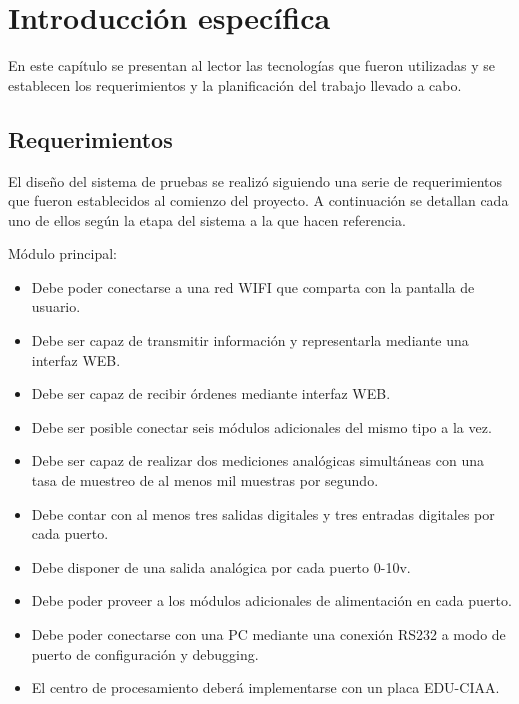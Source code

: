 \chapter{Introducción específica} %

\label{Chapter2}

En este capítulo se presentan al lector las tecnologías que fueron utilizadas y  se establecen los requerimientos y la planificación del trabajo llevado a cabo.


\section{Requerimientos}
El diseño del sistema de pruebas se realizó siguiendo una serie de requerimientos que fueron establecidos al comienzo del proyecto. A continuación se detallan cada uno de ellos según la etapa del sistema a la que hacen referencia.

Módulo principal:

\begin{itemize}
	\item Debe poder conectarse a una red WIFI que comparta con la pantalla de usuario.
	\item Debe ser capaz de transmitir información y representarla mediante una interfaz WEB.
	\item Debe ser capaz de recibir órdenes mediante interfaz WEB.
	\item Debe ser posible conectar seis módulos adicionales del mismo tipo a la vez.
	\item Debe ser capaz de realizar dos mediciones analógicas simultáneas con una tasa de 	muestreo de al menos mil muestras por segundo.
	\item Debe contar con al menos tres salidas digitales y tres entradas digitales por cada puerto. 
	\item Debe disponer de una salida analógica por cada puerto 0-10v.	
	\item Debe poder proveer a los módulos adicionales de alimentación en cada puerto.
	\item Debe poder conectarse con una PC mediante una conexión RS232 a modo de 		puerto de configuración y debugging.
	\item El centro de procesamiento deberá implementarse con un placa EDU-CIAA.
	
\end{itemize}

